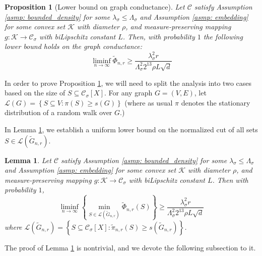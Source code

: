 \documentclass{article}
\newcommand{\set}[1]{\left\{#1\right\}}
\newcommand{\1}{\mathbf{1}}
\newcommand{\Xbf}{X}             %
\newcommand{\Cset}{\mathcal{C}}
\newcommand{\Csig}{\Cset_{\sigma}}
\theoremstyle{aldenthm}
\newtheorem{lemma}{Lemma}
\newtheorem{proposition}{Proposition}
\theoremstyle{aldenrmrk}
\begin{document}
\begin{proposition}[Lower bound on graph conductance]
	\label{prop: graph_conductance_profile_lb}
	Let $\Cset$ satisfy Assumption \ref{asmp: bounded_density} for some $\lambda_{\sigma} \leq \Lambda_{\sigma}$ and Assumption \ref{asmp: embedding} for some convex set $\mathcal{K}$ with diameter $\rho$, and measure-preserving mapping $g: \mathcal{K} \to \Csig$ with biLipschitz constant $L$. Then, with probability $1$ the following lower bound holds on the graph conductance:
	\begin{equation*}
	\liminf_{n \to \infty} \widetilde{\Phi}_{n,r} \geq \frac{\lambda_{\sigma}^2 r}{\Lambda_{\sigma}^2 2^{13} \rho L \sqrt{d}}
	\end{equation*}
\end{proposition}

In order to prove Proposition \ref{prop: graph_conductance_profile_lb}, we will need to split the analysis into two cases based on the size of $S \subseteq \Csig[\Xbf]$. For any graph $G = (V,E)$, let $\mathcal{L}(G) = \set{S \subseteq V: \pi(S) \geq s(G)}$ (where as usual $\pi$ denotes the stationary distribution of a random walk over $G$.)

In Lemma \ref{lem: graph_conductance_profile_lb}, we establish a uniform lower bound on the normalized cut of all sets $S \in \mathcal{L}(\widetilde{G}_{n,r})$. 

\begin{lemma}
	\label{lem: graph_conductance_profile_lb}
	Let $\Cset$ satisfy Assumption \ref{asmp: bounded_density} for some $\lambda_{\sigma} \leq \Lambda_{\sigma}$ and Assumption \ref{asmp: embedding} for some convex set $\mathcal{K}$ with diameter $\rho$, and measure-preserving mapping $g: \mathcal{K} \to \Csig$ with biLipschitz constant $L$. Then with probability $1$,
	\begin{equation*}
	\liminf_{n \to \infty} \left\{ \min_{S \in \mathcal{L}(\widetilde{G}_{n,r})} \widetilde{\Phi}_{n,r}(S) \right\} \geq \frac{\lambda_{\sigma}^2 r}{\Lambda_{\sigma}^2 2^{13} \rho L \sqrt{d}}
	\end{equation*}
	where $\mathcal{L}(\widetilde{G}_{n,r}) = \set{S \subseteq \Csig[\Xbf]: \widetilde{\pi}_{n,r}(S) \geq s(\widetilde{G}_{n,r})}$.
\end{lemma}

The proof of Lemma \ref{lem: graph_conductance_profile_lb} is nontrivial, and we devote the following subsection to it. 
\end{document}
